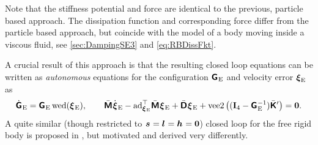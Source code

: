 Note that the stiffness potential and force are identical to the previous, particle based approach.
The dissipation function and corresponding force differ from the particle based approach, but coincide with the model of a body moving inside a viscous fluid, see \autoref{sec:DampingSE3} and \eqref{eq:RBDissFkt}.

A crucial result of this approach is that the resulting closed loop equations can be written as \textit{autonomous} equations for the configuration $\bodyHomoCoordE{}{}$ and velocity error $\boldsymbol{\xi}_{\mathrm{E}}{}{}$ as
\begin{align}\label{eq:ClosedLoopRBApproach2}
 \bodyHomoCoordEd{}{} = \bodyHomoCoordE{}{} \wedOp(\bodyVelE{}{}),
\qquad
 \bodyInertiaMatC{}{} \bodyVelEd{}{} - \ad{\bodyVelE{}{}}^\top \bodyInertiaMatC{}{} \bodyVelE{}{} + \bodyDissMatC{}{} \bodyVelE{}{} + \veeTwoOp \big( (\idMat[4] - \bodyHomoCoordE{}{}^{-1}) \bodyStiffMatCp{}{} \big) = \tuple{0}.
\end{align}
A quite similar (though restricted to $\bodyCOM{}{}=\bodyCOD{}{}=\bodyCOS{}{}=\tuple{0}$) closed loop for the free rigid body is proposed in \cite{Koditschek:TotalEnergy}, but motivated and derived very differently.

